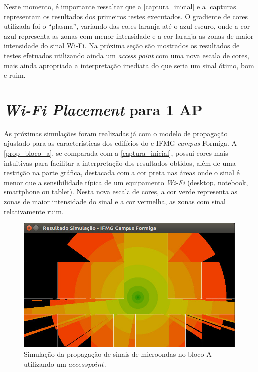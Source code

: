 \documentclass[
	12pt,				%
	twoside,			%
	a4paper,			%
	english,			%
	french,				%
	spanish,			%
	brazil				%
	]{abntex2}
\begin{document}
Neste momento, é importante ressaltar que a \autoref{captura_inicial} e
a \autoref{capturas} representam os resultados dos primeiros testes
executados. O gradiente de cores utilizada foi o ``plasma'', variando
das cores laranja até o azul escuro, onde a cor azul representa as zonas
com menor intensidade e a cor laranja as zonas de maior intensidade do
sinal Wi-Fi. Na próxima seção são mostrados os resultados de testes
efetuados utilizando ainda um \emph{access point} com uma nova escala de
cores, mais ainda apropriada a interpretação imediata do que seria um
sinal ótimo, bom e ruim.

\section{\texorpdfstring{\emph{Wi-Fi Placement} para 1
AP}{Wi-Fi Placement para 1 AP}}\label{wi-fi-placement-para-1-ap}

As próximas simulações foram realizadas já com o modelo de propagação
ajustado para as características dos edifícios do e IFMG \emph{campus}
Formiga. A \autoref{prop_bloco_a}, se comparada com a
\autoref{captura_inicial}, possui cores mais intuitivas para facilitar a
interpretação dos resultados obtidos, além de uma restrição na parte
gráfica, destacada com a cor preta nas áreas onde o sinal é menor que a
sensibilidade típica de um equipamento \emph{Wi-Fi} (desktop, notebook,
smartphone ou tablet). Nesta nova escala de cores, a cor verde
representa as zonas de maior intensidade do sinal e a cor vermelha, as
zonas com sinal relativamente ruim.

\begin{figure}[ht]
    \caption{\label{prop_bloco_a} Simulação da propagação de sinais de microondas no bloco A utilizando um $access point$.}
    \begin{center}
        \includegraphics[scale=0.7]{imagens/prop-bloco-a-2.jpg}
    \end{center}
\end{figure}
\end{document}
